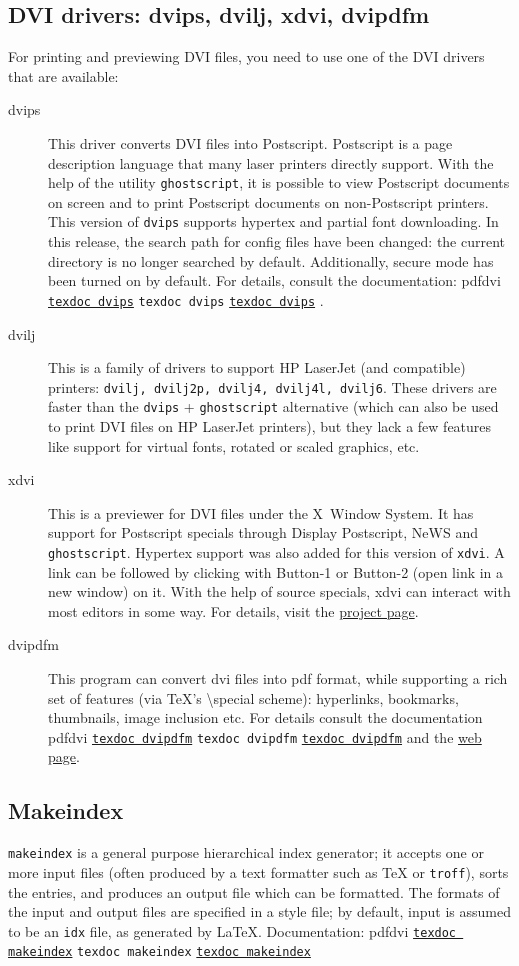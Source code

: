 \documentclass[11pt,a4paper]{article}
\newcommand{\pdfext}{pdf}
\newcommand{\dviext}{dvi}
\let\docext=\pdfext
\let\docext=\dviext
\newcommand{\dlink}[3]{%
  \ifpdf
    \ifx\pdfext#3
      \href{#1/#2.#3}{\texttt{texdoc #2}}%
    \else
      \texttt{texdoc #2}%
    \fi
  \else
     \href{#1/#2.#3}{\mbox{\texttt{texdoc #2}}}%
  \fi}
\begin{document}
\subsection{DVI drivers: dvips, dvilj, xdvi, dvipdfm}
For printing and previewing DVI files, you need to use one of the DVI
drivers that are available:
\begin{description}
\item [dvips] This driver converts DVI files into Postscript.
  Postscript is a page description language that many laser printers
  directly support. With the help of the utility \texttt{ghostscript},
  it is possible to view Postscript documents on screen and to print
  Postscript documents on non-Postscript printers. This version of
  \texttt{dvips} supports hypertex and partial font downloading.  In
  this release, the search path for config files have been changed:
  the current directory is no longer searched by default.
  Additionally, secure mode has been turned on by default. For
  details, consult the documentation:
  \dlink{../programs}{dvips}{\dviext}.
\item [dvilj] This is a family of drivers to support HP LaserJet (and
  compatible) printers: \texttt{dvilj, dvilj2p, dvilj4, dvilj4l,
    dvilj6}. These drivers are faster than the \texttt{dvips} +
  \texttt{ghostscript} alternative (which can also be used to print
  DVI files on HP LaserJet printers), but they lack a few features
  like support for virtual fonts, rotated or scaled graphics, etc.
\item [xdvi] This is a previewer for DVI files under the X~Window
  System. It has support for Postscript specials through Display
  Postscript, NeWS and \texttt{ghostscript}. Hypertex support was also
  added for this version of \texttt{xdvi}. A link can be followed by
  clicking with Button-1 or Button-2 (open link in a new window) on
  it. With the help of source specials, xdvi can interact with most
  editors in some way. For details, visit the
  \href{http://xdvi.sourceforge.net/inverse-search.html}{project
    page}.
\item [dvipdfm] This program can convert dvi files into pdf format,
  while supporting a rich set of features (via TeX's
  \textbackslash special scheme): hyperlinks, bookmarks, thumbnails,
  image inclusion etc. For details consult the documentation
  \dlink{../programs}{dvipdfm}{\docext} and the
  \href{http://gaspra.kettering.edu/dvipdfm/}{web page}.
\end{description}


\subsection{Makeindex}
\texttt{makeindex} is a general purpose hierarchical index generator;
it accepts one or more input files (often produced by a text formatter
such as \TeX{} or \texttt{troff}), sorts the entries, and produces an
output file which can be formatted.  The formats of the input and
output files are specified in a style file; by default, input is
assumed to be an \texttt{idx} file, as generated by \LaTeX.
Documentation: \dlink{../makeindex}{makeindex}{\dviext}
\end{document}
